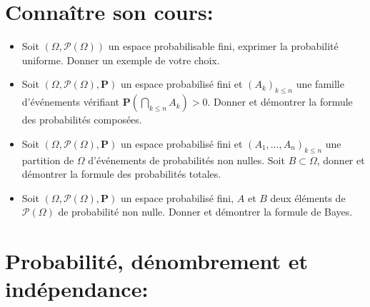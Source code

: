 \documentclass[a4paper,11pt]{article}
\theoremstyle{definition}
\newcommand{\Pb}{\mathbf{P}}
\begin{document}
 

\noindent{}

\bigskip
\section*{Connaître son cours:}
\begin{itemize}[$\bullet$]
	\item Soit $(\Omega, \mathcal P(\Omega))$ un espace probabilisable fini, exprimer la probabilité uniforme. Donner un exemple de votre choix.  
	\item Soit $(\Omega, \mathcal P(\Omega),\Pb)$ un espace probabilisé fini et $(A_k )_{k\leq n}$ une famille d’événements vérifiant $\displaystyle\Pb\left(\underset{k\leq n}{\bigcap} A_k \right) >   0$. Donner et démontrer la formule des probabilités composées. 
	\item Soit $(\Omega, \mathcal P(\Omega),\Pb)$ un espace probabilisé fini et $(A_1,\dots,A_n)_{k\leq n}$ une partition de $\Omega$ d’événements de probabilités non nulles. Soit $B \subset \Omega$, donner et démontrer la formule des probabilités totales.
	\item Soit $(\Omega, \mathcal P(\Omega),\Pb)$ un espace probabilisé fini, $A$ et $B$ deux éléments de $\mathcal P(\Omega)$ de probabilité non nulle. Donner et démontrer la formule de Bayes.


\end{itemize}
\raggedright
\medskip

\section*{Probabilité, dénombrement et indépendance:}\hfill\\%
\medskip
   
\end{document}
